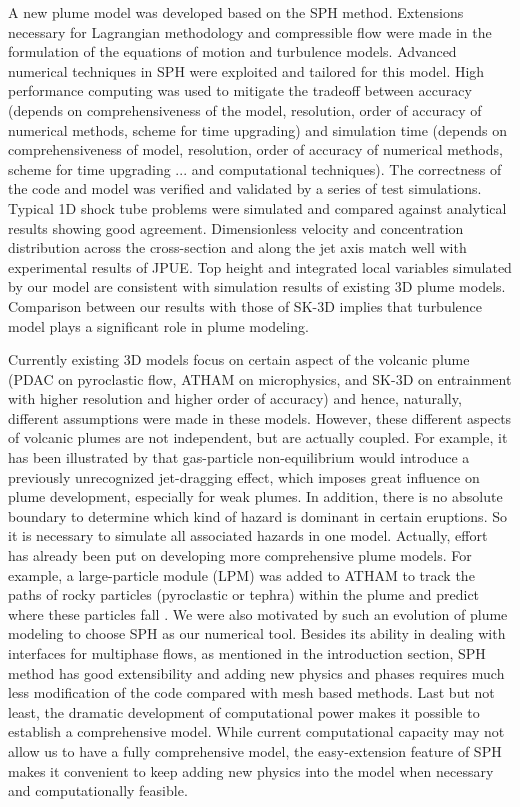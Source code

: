 \documentclass[gmd, manuscript]{copernicus}
\begin{document}
\conclusions  \label{sec:conclusion}%
A new plume model was developed based on the SPH method. Extensions necessary for Lagrangian methodology and compressible flow were made in the formulation of the equations of motion and turbulence models. Advanced numerical techniques in SPH were exploited and tailored for this model. High performance computing was used to mitigate the tradeoff between accuracy (depends on comprehensiveness of the model, resolution, order of accuracy of numerical methods, scheme for time upgrading) and simulation time (depends on comprehensiveness of model, resolution, order of accuracy of numerical methods, scheme for time upgrading ... and computational techniques). The correctness of the code and model was verified and validated by a series of test simulations. Typical 1D shock tube problems were simulated and compared against analytical results showing good agreement. Dimensionless velocity and concentration distribution across the cross-section and along the jet axis match well with experimental results of JPUE. Top height and integrated local variables simulated by our model are consistent with simulation results of existing 3D plume models. Comparison between our results with those of SK-3D implies that turbulence model plays a significant role in plume modeling.

Currently existing 3D models focus on certain aspect of the volcanic plume (PDAC on pyroclastic flow, ATHAM on microphysics, and SK-3D on entrainment with higher resolution and higher order of accuracy) and hence, naturally, different assumptions were made in these models. However, these different aspects of volcanic plumes are not independent, but are actually coupled. For example, it has been illustrated by \cite{cerminara2016large} that gas-particle non-equilibrium would introduce a previously unrecognized jet-dragging effect, which imposes great influence on plume development, especially for weak plumes. In addition, there is no absolute boundary to determine which kind of hazard is dominant in certain eruptions. So it is necessary to simulate all associated hazards in one model. Actually, effort has already been put on developing more comprehensive plume models. For example, a large-particle module (LPM) was added to ATHAM to track the paths of rocky particles (pyroclastic or tephra) within the plume and predict where these particles fall \citep{kobs2009modeling}. We were also motivated by such an evolution of plume modeling to choose SPH as our numerical tool. Besides its ability in dealing with interfaces for multiphase flows, as mentioned in the introduction section, SPH method has good extensibility and adding new physics and phases requires much less modification of the code compared with mesh based methods. Last but not least, the dramatic development of computational power makes it possible to establish a comprehensive model. While current computational capacity may not allow us to have a fully comprehensive model, the easy-extension feature of SPH makes it convenient to keep adding new physics into the model when necessary and computationally feasible. 
\end{document}
